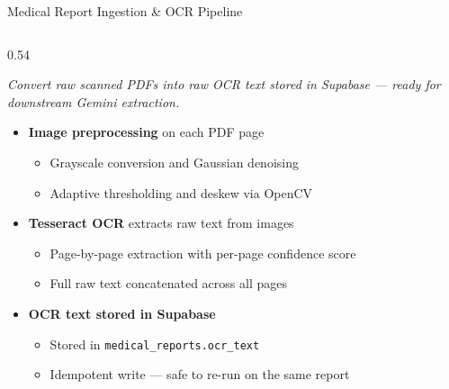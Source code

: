 \documentclass[aspectratio=169,11pt]{beamer}
\begin{document}


\begin{frame}{Medical Report Ingestion \& OCR Pipeline}

  \begin{columns}[T]

    \begin{column}{0.54\textwidth}

      {\small\itshape\color{Gray}%
        Convert raw scanned PDFs into raw OCR text stored in Supabase ---
        ready for downstream Gemini extraction.}

      \vspace{0.18cm}

      \begin{itemize}
        \setlength{\itemsep}{4pt}

        \item \textbf{Image preprocessing} on each PDF page
          \begin{itemize}
            \setlength{\itemsep}{1pt}
            \item Grayscale conversion and Gaussian denoising
            \item Adaptive thresholding and deskew via OpenCV
          \end{itemize}

        \item \textbf{Tesseract OCR} extracts raw text from images
          \begin{itemize}
            \setlength{\itemsep}{1pt}
            \item Page-by-page extraction with per-page confidence score
            \item Full raw text concatenated across all pages
          \end{itemize}

        \item \textbf{OCR text stored in Supabase}
          \begin{itemize}
            \setlength{\itemsep}{1pt}
            \item Stored in \texttt{medical\_reports.ocr\_text}
            \item Idempotent write --- safe to re-run on the same report
          \end{itemize}


\end{itemize}
\end{column}
\end{columns}
\end{frame}
\end{document}
